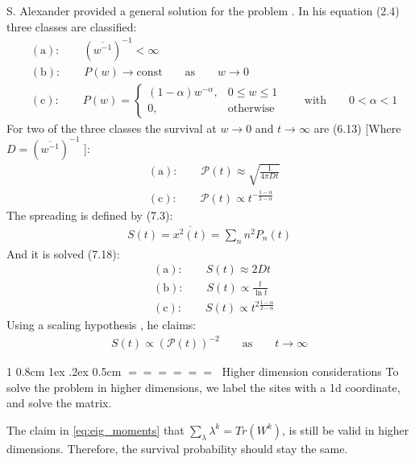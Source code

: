 \documentclass[onecolumn,fleqn,notitlepage,secnumarabic]{revtex4}
\makeatletter
\def\section{%
  \@startsection
    {section}%
    {1}%
    {\z@}%
    {0.8cm \@plus1ex \@minus .2ex}%
    {0.5cm}%
    {\Large\bf $=\!=\!=\!=\!=\!=\;$}%
}%
\makeatother
\begin{document}
S. Alexander provided a general solution for the problem \cite{Alexander:1981:RMP}. In his equation (2.4) three classes are classified:
\begin{align} 
    &\mathrm{(a) : }\qquad (\overline{w^{-1}})^{-1} < \infty  \\
    &\mathrm{(b) : }\qquad P(w)\rightarrow \mathrm{const} \qquad\mathrm{as}\qquad w \rightarrow 0 \\
    &\mathrm{(c) : }\qquad P(w) = 
        \begin{cases} 
            (1-\alpha)w^{-\alpha} , & 0\le w \le 1 \\
            0, & \mathrm{otherwise}
        \end{cases}
        \qquad\mathrm{with}\qquad 0<\alpha<1
\end{align}
For two of the three classes the survival at $w\rightarrow 0$ and $t\rightarrow \infty$ are (6.13) [Where $D=(\overline{w^{-1}})^{-1}$ ]:
\begin{align}
&\mathrm{(a) : }\qquad \mathcal{P}(t) \approx \sqrt{\frac{1}{4\pi D t}}  \\
&\mathrm{(c) : }\qquad \mathcal{P}(t) \propto t^{-\frac{1-\alpha}{2-\alpha}}
\end{align}
The spreading is defined by (7.3):
\begin{align}\label{eq:spreading}
     S(t) = \overline{x^2(t)} = \sum_n n^2 P_n(t) 
\end{align}
And it is solved (7.18):
\begin{align}
    &\mathrm{(a) : }\qquad S(t) \approx 2Dt  \\
    &\mathrm{(b) : }\qquad S(t) \propto \frac{t}{\ln t}  \\
    &\mathrm{(c) : }\qquad S(t) \propto t^{2\frac{1-\alpha}{2-\alpha}}
\end{align}
Using a scaling hypothesis , he claims:
\begin{align}\label{eq:scaling_hypo}
S(t) \propto \left(\mathcal{P}(t)\right)^{-2} \qquad \mathrm{as}\qquad t\rightarrow \infty
\end{align}

\section{Higher dimension considerations}
To solve the problem in higher dimensions, we label the sites with a 1d coordinate, and solve the matrix.

The claim in \eqref{eq:eig_moments} that $\sum_\lambda \lambda^k = Tr (W^k)$, is still be valid in higher dimensions. Therefore, the survival probability should stay the same.
\end{document}
